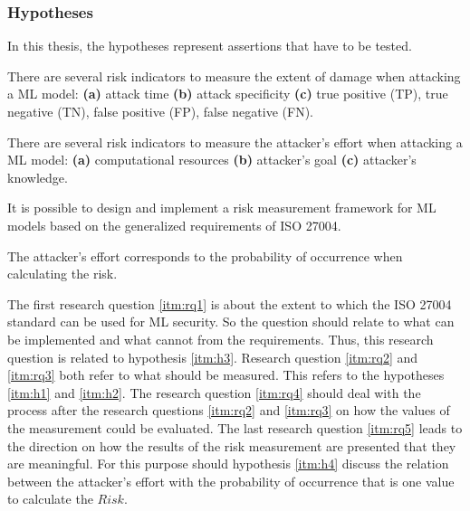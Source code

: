 \subsubsection*{Hypotheses}

In this thesis, the hypotheses represent assertions that have to be tested.


\begin{hypotheses}
  \item There are several risk indicators to measure the extent of damage when attacking a ML model: \textbf{(a)} attack time \textbf{(b)} attack specificity \textbf{(c)} true positive (TP), true negative (TN), false positive (FP), false negative (FN). \label{itm:h1}
  \item There are several risk indicators to measure the attacker's effort when attacking a ML model: \textbf{(a)} computational resources \textbf{(b)} attacker's goal \textbf{(c)} attacker's knowledge. \label{itm:h2}
  \item It is possible to design and implement a risk measurement framework for ML models based on the generalized requirements of ISO 27004. \label{itm:h3}
  \item The attacker's effort corresponds to the probability of occurrence when calculating the risk. \label{itm:h4}
\end{hypotheses}

The first research question \ref{itm:rq1} is about the extent to which the ISO 27004 standard can be used for ML security. So the question should relate to what can be implemented and what cannot from the requirements. Thus, this research question is related to hypothesis \ref{itm:h3}. Research question \ref{itm:rq2} and \ref{itm:rq3} both refer to what should be measured. This refers to the hypotheses \ref{itm:h1} and \ref{itm:h2}. The research question \ref{itm:rq4} should deal with the process after the research questions \ref{itm:rq2} and \ref{itm:rq3} on how the values of the measurement could be evaluated. The last research question \ref{itm:rq5} leads to the direction on how the results of the risk measurement are presented that they are meaningful. For this purpose should
hypothesis \ref{itm:h4} discuss the relation between the attacker's effort with the probability of occurrence that is one value to calculate the $Risk$. 
